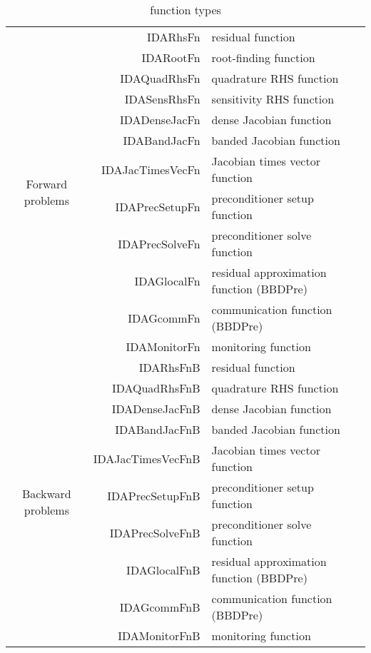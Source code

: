 \begin{table}[h]
\centering
\caption{{\idas} {\matlab} function types}
\label{t:idas_fct_types}
\medskip
\begin{tabular}{|c||r|l|r|}
  \hline
  \multirow{12}{*}{\begin{sideways} Forward problems \end{sideways}}
  &  IDARhsFn         &  residual function & \pageref{p:IDAResFn} \\
  &  IDARootFn        &  root-finding function  & \pageref{p:IDARootFn} \\
  &  IDAQuadRhsFn     &  quadrature RHS function & \pageref{p:IDAQuadRhsFn} \\
  &  IDASensRhsFn     &  sensitivity RHS function & \pageref{p:IDASensResFn} \\
  &  IDADenseJacFn    &  dense Jacobian function & \pageref{p:IDADenseJacFn} \\
  &  IDABandJacFn     &  banded Jacobian function & \pageref{p:IDABandJacFn} \\
  &  IDAJacTimesVecFn &  Jacobian times vector function & \pageref{p:IDAJacTimesVecFn} \\
  &  IDAPrecSetupFn   &  preconditioner setup function & \pageref{p:IDAPrecSetupFn} \\
  &  IDAPrecSolveFn   &  preconditioner solve function & \pageref{p:IDAPrecSolveFn} \\
  &  IDAGlocalFn      &  residual approximation function (BBDPre) & \pageref{p:IDAGlocalFn} \\
  &  IDAGcommFn       &  communication function (BBDPre) & \pageref{p:IDAGcommFn} \\
  &  IDAMonitorFn     &  monitoring function & \pageref{p:IDAMonitorFn} \\
  \hline
  \multirow{10}{*}{\begin{sideways} Backward problems \end{sideways}}
  &  IDARhsFnB        &  residual function & \pageref{p:IDAResFnB} \\
  &  IDAQuadRhsFnB    &  quadrature RHS function & \pageref{p:IDAQuadRhsFnB} \\
  &  IDADenseJacFnB   &  dense Jacobian function & \pageref{p:IDADenseJacFnB} \\
  &  IDABandJacFnB    &  banded Jacobian function & \pageref{p:IDABandJacFnB} \\
  &  IDAJacTimesVecFnB&  Jacobian times vector function & \pageref{p:IDAJacTimesVecFnB} \\
  &  IDAPrecSetupFnB  &  preconditioner setup function & \pageref{p:IDAPrecSetupFnB} \\
  &  IDAPrecSolveFnB  &  preconditioner solve function & \pageref{p:IDAPrecSolveFnB} \\
  &  IDAGlocalFnB     &  residual approximation function (BBDPre) & \pageref{p:IDAGlocalFnB} \\
  &  IDAGcommFnB      &  communication function (BBDPre) & \pageref{p:IDAGcommFnB} \\
  &  IDAMonitorFnB    &  monitoring function & \pageref{p:IDAMonitorFnB} \\
 \hline
\end{tabular}
\end{table}
